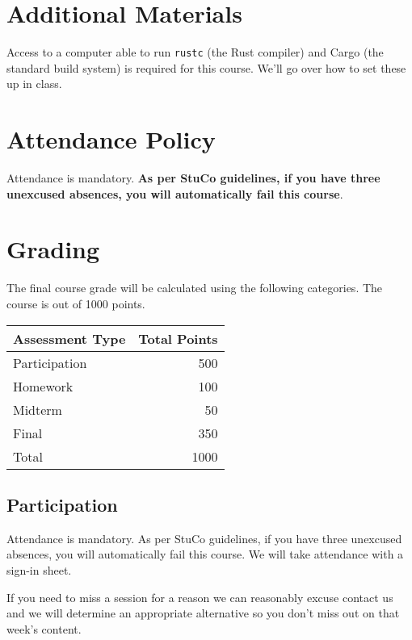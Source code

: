 \documentclass{article}
\begin{document}
\section*{Additional Materials}

Access to a computer able to run \texttt{rustc} (the Rust compiler) and Cargo
(the standard build system) is required for this course. We'll go over how to
set these up in class.

\section*{Attendance Policy}

Attendance is mandatory. \textbf{As per StuCo guidelines, if you have three
unexcused absences, you will automatically fail this course}.

\section*{Grading}

The final course grade will be calculated using the following categories. The
course is out of 1000 points.

\begin{center}
    \begin{tabular}{@{}lr@{}}
    Assessment Type     & Total Points \\ \toprule
    Participation       &          500 \\
    Homework            &          100 \\
    Midterm             &           50 \\
    Final               &          350 \\ \midrule
    Total               &         1000 \\ \bottomrule
\end{tabular}
\end{center}

\subsection*{Participation}

Attendance is mandatory. As per StuCo guidelines, if you have three unexcused
absences, you will automatically fail this course. We will take attendance with
a sign-in sheet.

If you need to miss a session for a reason we can reasonably excuse contact us
and we will determine an appropriate alternative so you don't miss out on that
week's content.
\end{document}
